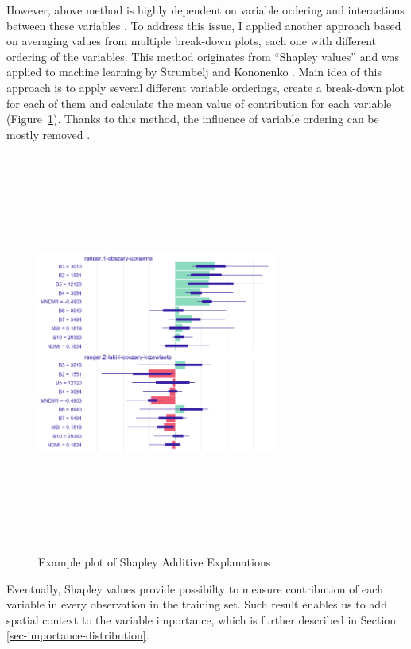 \documentclass{amuthesis}
\begin{document}
However, above method is highly dependent on variable ordering and
interactions between these variables \autocite{biecek_explanatory_2021}.
To address this issue, I applied another approach based on averaging
values from multiple break-down plots, each one with different ordering
of the variables. This method originates from ``Shapley values''
\autocite{shapley_value_1953} and was applied to machine learning by
Štrumbelj and Kononenko \autocite*{strumbelj_efficient_2010}. Main idea
of this approach is to apply several different variable orderings,
create a break-down plot for each of them and calculate the mean value
of contribution for each variable (Figure~\ref{fig-rycina6}). Thanks to
this method, the influence of variable ordering can be mostly removed
\autocite{biecek_explanatory_2021}.

\begin{figure}[t]

{\centering \includegraphics[width=0.7\textwidth,height=5.20833in]{./figures/shapley_values.png}

}

\caption{\label{fig-rycina6}Example plot of Shapley Additive
Explanations}

\end{figure}

Eventually, Shapley values provide possibilty to measure contribution of
each variable in every observation in the training set. Such result
enables us to add spatial context to the variable importance, which is
further described in Section \ref{sec-importance-distribution}.
\end{document}
